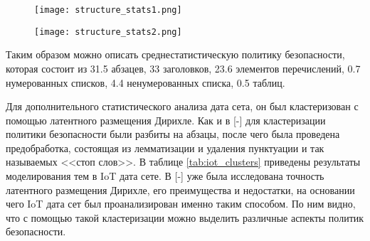 \documentclass[../main]{subfiles}
\begin{document}
\begin{figure}[H]
    \centering
    {\texttt{[image: structure\_stats1.png]}}
    \vspace{-\baselineskip}
\end{figure}

\begin{figure}[H]
    \centering
    {\texttt{[image: structure\_stats2.png]}}
    \vspace{-\baselineskip}
\end{figure}

Таким образом можно описать среднестатистическую политику безопасности, которая состоит из 31.5 абзацев, 33 заголовков, 23.6 элементов перечислений, 0.7 нумерованных списков, 4.4 ненумерованных списка, 0.5 таблиц.

Для дополнительного статистического анализа дата сета, он был кластеризован с помощью латентного размещения Дирихле. Как и в [-] для кластеризации политики безопасности были разбиты на абзацы, после чего была проведена предобработка, состоящая из лемматизации и удаления пунктуации и так называемых <<стоп слов>>. В таблице \ref{tab:iot_clusters} приведены результаты моделирования тем в IoT дата сете. В [-] уже была исследована точность латентного размещения Дирихле, его преимущества и недостатки, на основании чего IoT дата сет был проанализирован именно таким способом.  По ним видно, что с помощью такой кластеризации можно выделить различные аспекты политик безопасности.
\end{document}
